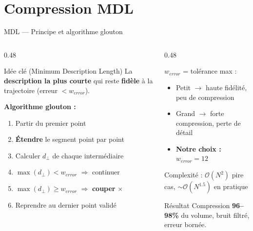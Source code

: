 \documentclass[aspectratio=169, 11pt]{beamer}
\begin{document}
\section{Compression MDL}

\begin{frame}{MDL — Principe et algorithme glouton}

\begin{columns}[T]
\begin{column}{0.48\textwidth}

\begin{block}{Idée clé (Minimum Description Length)}
La \textbf{description la plus courte} qui reste \textbf{fidèle} à la trajectoire (erreur $< w_{error}$).
\end{block}

\vspace{0.2cm}

\textbf{Algorithme glouton :}
\begin{enumerate}\setlength{\itemsep}{0pt}
    \item Partir du premier point
    \item \textbf{Étendre} le segment point par point
    \item Calculer $d_\perp$ de chaque intermédiaire
    \item $\max(d_\perp) < w_{error}$ $\Rightarrow$ continuer \textcolor{dota_green}{\checkmark}
    \item $\max(d_\perp) \geq w_{error}$ $\Rightarrow$ \textbf{couper} \textcolor{dota_accent}{\textbf{$\times$}}
    \item Reprendre au dernier point validé
\end{enumerate}

\end{column}
\begin{column}{0.48\textwidth}

    \textbf{$w_{error}$} = tolérance max :
    \begin{itemize}\setlength{\itemsep}{0pt}
        \item Petit $\to$ haute fidélité, peu de compression
        \item Grand $\to$ forte compression, perte de détail
        \item \textcolor{dota_accent}{\textbf{Notre choix : $w_{error} = 12$}}
    \end{itemize}

    \vspace{0.2cm}
    {\small Complexité : $\mathcal{O}(N^2)$ pire cas, $\sim\mathcal{O}(N^{1.5})$ en pratique}

    \vspace{0.2cm}
    \begin{alertblock}{Résultat}
    Compression \textbf{96--98\%} du volume, bruit filtré, erreur bornée.
    \end{alertblock}
\end{column}
\end{columns}

\end{frame}
\end{document}
